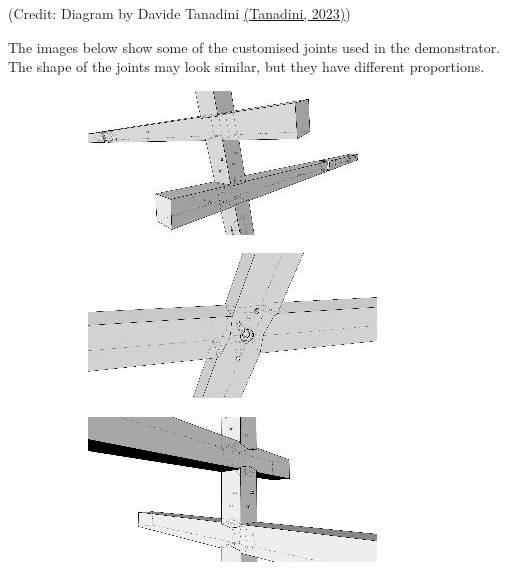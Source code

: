 \documentclass[11pt]{book}
\begin{document}
{\footnotesize (Credit: Diagram by Davide Tanadini \href{https://www.zotero.org/google-docs/?U562KI}{(Tanadini, 2023)})}

\vspace{1\baselineskip}
The images below show some of the customised joints used in the demonstrator. The shape of the joints may look similar, but they have different proportions. 

\begin{figure}[H]
\centering
\begin{subfigure}[b]{0.23\textwidth}
\centering
\includegraphics[width=\textwidth]{./images/image6.jpeg}
\end{subfigure}
\hfill
\begin{subfigure}[b]{0.23\textwidth}
\centering
\includegraphics[width=\textwidth]{./images/image7.jpeg}
\end{subfigure}
\hfill
\begin{subfigure}[b]{0.23\textwidth}
\centering
\includegraphics[width=\textwidth]{./images/image8.jpeg}

\end{subfigure}
\end{figure}
\end{document}
